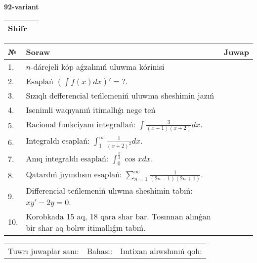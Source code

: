 \documentclass{article}
\begin{document}
  \egroup
  
  \newpage
  
  
  \textbf{92-variant}\\
  
  \bgroup
  \def\arraystretch{1.6} %
  
  \begin{tabular}{|m{5.7cm}|m{9.5cm}|}
  \hline
  Shifr & \\
  \hline
  \end{tabular}
  
  \vspace{1cm}
  
  \begin{tabular}{|m{0.7cm}|m{10cm}|m{4cm}|}
  \hline
  № & Soraw & Juwap \\
  \hline
  1. & \(n\)-dárejeli kóp aǵzalınıń uluwma kórinisi &  \\
  \hline
  2. & Esaplań \(\left( \int{f(x)dx} \right)' = ?\). &  \\
  \hline
  3. & Sızıqlı defferencial teńlemeniń uluwma sheshimin jazıń &  \\
  \hline
  4. & Isenimli waqıyanıń itimallıǵı nege teń &  \\
  \hline
  5. & Racional funkciyanı integrallań: \(\int{\frac{3}{(x - 1)(x + 2)}dx}\). &  \\
  \hline
  6. & Integraldı esaplań: \(\int_{1}^{\infty}{\frac{1}{(x + 2)^2 }dx}\). &  \\
  \hline
  7. & Anıq integraldı esaplań: \(\int_{0}^{\frac{\pi}{2}}{\cos xdx}\). &  \\
  \hline
  8. & Qatardıń jıyındısın esaplań: \(\sum_{n = 1}^{\infty}\frac{1}{(2n - 1)(2n + 1)}\). &  \\
  \hline
  9. & Differencial teńlemeniń ulıwma sheshimin tabıń: \(xy' - 2y = 0\). &  \\
  \hline
  10. & Korobkada 15 aq, 18 qara shar bar. Tosınnan alınǵan bir shar aq bolıw itimallıǵın tabıń. &  \\
  \hline
  \end{tabular}
  
  \vspace{1cm}
  
  \begin{tabular}{lll}
  Tuwrı juwaplar sanı: \underline{\hspace{1.5cm}} & 
  Bahası: \underline{\hspace{1.5cm}} & 
  Imtixan alıwshınıń qolı: \underline{\hspace{2cm}} \\
  \end{tabular}
  
\end{document}
